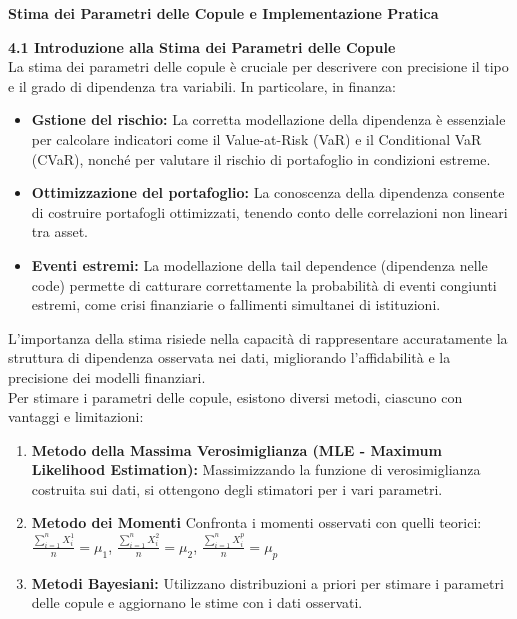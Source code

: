 \documentclass[a4paper,12pt]{article}
\begin{document}
\begin{center}
	\Huge \textbf{Stima dei Parametri delle Copule e Implementazione Pratica} 
\end{center}

\vspace{1cm}
\noindent\textbf{4.1 Introduzione alla Stima dei Parametri delle Copule} \\

\noindent La stima dei parametri delle copule è cruciale per descrivere con precisione il tipo e il grado di dipendenza tra variabili. In particolare, in finanza:

\begin{itemize}
	\item \textbf{Gstione del rischio: }La corretta modellazione della dipendenza è essenziale per calcolare indicatori come il Value-at-Risk (VaR) e il Conditional VaR (CVaR), nonché per valutare il rischio di portafoglio in condizioni estreme.
	\item \textbf{Ottimizzazione del portafoglio: }La conoscenza della dipendenza consente di costruire portafogli ottimizzati, tenendo conto delle correlazioni non lineari tra asset.
	\item \textbf{Eventi estremi: }La modellazione della tail dependence (dipendenza nelle code) permette di catturare correttamente la probabilità di eventi congiunti estremi, come crisi finanziarie o fallimenti simultanei di istituzioni.
\end{itemize}
L'importanza della stima risiede nella capacità di rappresentare accuratamente la struttura di dipendenza osservata nei dati, migliorando l'affidabilità e la precisione dei modelli finanziari.\\
Per stimare i parametri delle copule, esistono diversi metodi, ciascuno con vantaggi e limitazioni:
\begin{enumerate}
	\item \textbf{Metodo della Massima Verosimiglianza (MLE - Maximum Likelihood Estimation):} Massimizzando la funzione di verosimiglianza costruita sui dati, si ottengono degli stimatori per i vari parametri.
	\item \textbf{Metodo dei Momenti} Confronta i momenti osservati con quelli teorici: $\frac{\sum_{i=1}^n X_i^1}{n} = \mu_1$, $\frac{\sum_{i=1}^n X_i^2}{n} = \mu_2
	$,  $\frac{\sum_{i=1}^n X_i^p}{n} = \mu_p$
	\item \textbf{Metodi Bayesiani: }Utilizzano distribuzioni a priori per stimare i parametri delle copule e aggiornano le stime con i dati osservati.
\end{enumerate}
\end{document}
